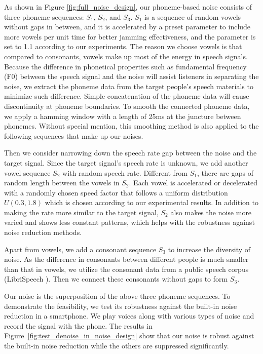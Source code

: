 As shown in Figure \ref{fig:full_noise_design}, our phoneme-based noise consists of three phoneme sequences: $S_1$, $S_2$, and $S_3$. $S_1$ is a sequence of random vowels without gaps in between, and it is accelerated by a preset parameter to include more vowels per unit time for better jamming effectiveness, and the parameter is set to 1.1 according to our experiments. The reason we choose vowels is that compared to consonants, vowels make up most of the energy in speech signals. Because the difference in phonetical properties such as fundamental frequency (F0) between the speech signal and the noise will assist listeners in separating the noise, we extract the phoneme data from the target people's speech materials to minimize such difference. Simple concatenation of the phoneme data will cause discontinuity at phoneme boundaries. To smooth the connected phoneme data, we apply a hamming window with a length of 25ms at the juncture between phonemes. Without special mention, this smoothing method is also applied to the following sequences that make up our noises.

Then we consider narrowing down the speech rate gap between the noise and the target signal. Since the target signal's speech rate is unknown, we add another vowel sequence $S_2$ with random speech rate. Different from $S_1$, there are gaps of random length between the vowels in $S_2$. Each vowel is accelerated or decelerated with a randomly chosen speed factor that follows a uniform distribution $U(0.3, 1.8)$ which is chosen according to our experimental results. In addition to making the rate more similar to the target signal, $S_2$ also makes the noise more varied and shows less constant patterns, which helps with the robustness against noise reduction methods.

Apart from vowels, we add a consonant sequence $S_3$ to increase the diversity of noise. As the difference in consonants between different people is much smaller than that in vowels, we utilize the consonant data from a public speech corpus (LibriSpeech \cite{LibriSpeech}). Then we connect these consonants without gaps to form $S_3$.

Our noise is the superposition of the above three phoneme sequences. To demonstrate the feasibility, we test its robustness against the built-in noise reduction in a smartphone. We play voices along with various types of noise and record the signal with the phone. The results in Figure~\ref{fig:test_denoise_in_noise_design} show that our noise is robust against the built-in noise reduction while the others are suppressed significantly.

